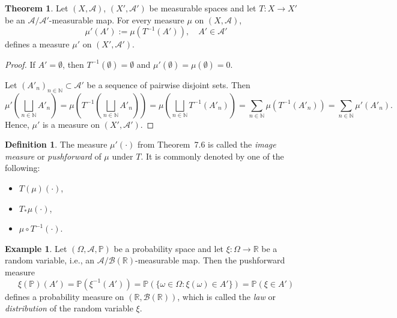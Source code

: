 \documentclass[12pt]{article}
\theoremstyle{definition}
\newtheorem{definition}{Definition}[section]
\newtheorem{theorem}{Theorem}[section]
\newtheorem{example}{Example}[section]
\begin{document}
\medskip
\begin{theorem}
Let \( (X, \mathcal{A}) \), \( (X', \mathcal{A}') \) be measurable spaces and let \( T : X \to X' \) be an \( \mathcal{A}/\mathcal{A}' \)-measurable map. For every measure \( \mu \) on \( (X, \mathcal{A}) \),
\[
\mu'(A') := \mu(T^{-1}(A')), \quad A' \in \mathcal{A}'
\]
defines a measure \( \mu' \) on \( (X', \mathcal{A}') \).
\end{theorem}

\begin{proof}
If \( A' = \emptyset \), then \( T^{-1}(\emptyset) = \emptyset \) and \( \mu'(\emptyset) = \mu(\emptyset) = 0 \).

Let \( (A'_n)_{n \in \mathbb{N}} \subset \mathcal{A}' \) be a sequence of pairwise disjoint sets. Then
\[
\mu'\left( \bigsqcup_{n \in \mathbb{N}} A'_n \right)
= \mu\left( T^{-1} \left( \bigsqcup_{n \in \mathbb{N}} A'_n \right) \right)
= \mu\left( \bigsqcup_{n \in \mathbb{N}} T^{-1}(A'_n) \right)
= \sum_{n \in \mathbb{N}} \mu\left( T^{-1}(A'_n) \right)
= \sum_{n \in \mathbb{N}} \mu'(A'_n).
\]
Hence, \( \mu' \) is a measure on \( (X', \mathcal{A}') \).
\end{proof}

\medskip
\begin{definition}
The measure \( \mu'(\cdot) \) from Theorem~7.6 is called the \emph{image measure} or \emph{pushforward} of \( \mu \) under \( T \). It is commonly denoted by one of the following:
\begin{itemize}
  \item \( T(\mu)(\cdot) \),
  \item \( T_* \mu(\cdot) \),
  \item \( \mu \circ T^{-1}(\cdot) \).
\end{itemize}
\end{definition}

\medskip
\begin{example}
Let \( (\Omega, \mathcal{A}, \mathbb{P}) \) be a probability space and let \( \xi : \Omega \to \mathbb{R} \) be a random variable, i.e., an \( \mathcal{A} / \mathcal{B}(\mathbb{R}) \)-measurable map. Then the pushforward measure
\[
\xi(\mathbb{P})(A') = \mathbb{P}(\xi^{-1}(A')) = \mathbb{P}(\{ \omega \in \Omega : \xi(\omega) \in A' \}) = \mathbb{P}(\xi \in A')
\]
defines a probability measure on \( (\mathbb{R}, \mathcal{B}(\mathbb{R})) \), which is called the \emph{law} or \emph{distribution} of the random variable \( \xi \).
\end{example}
\end{document}
